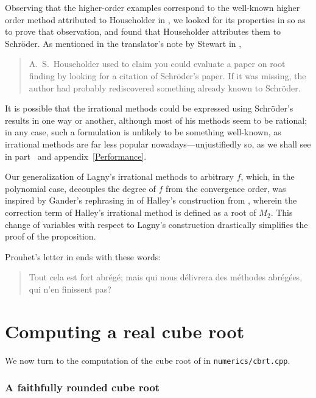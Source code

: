 ﻿\documentclass[10pt, a4paper, twoside]{basestyle}
\begin{document}
Observing that the higher-order examples correspond to the well-known higher order
method attributed to Householder in \cite{SebahGourdon2001}, we looked for its properties in \cite{Householder1970} so as to prove that observation, and found that Householder attributes
them to Schröder.
As mentioned in the translator’s note by Stewart in \cite{SchröderStewart1993},
\begin{quote}
A.~S.~Householder used to claim you could evaluate a paper on
root finding by looking for a citation of Schröder’s paper. If it was
missing, the author had probably rediscovered something already
known to Schröder.
\end{quote}
It is possible that the irrational methods could be expressed using Schröder’s results in one way or another, although most of his methods seem to be rational; in any case, such a formulation
is unlikely to be something well-known, as irrational methods are far less popular
nowadays---unjustifiedly so, as we shall see in part~\ref{CubeRoot} and appendix~\ref{Performance}.

Our generalization of Lagny's irrational methods to arbitrary $f$, which, in the polynomial case,
decouples the degree of $f$ from the convergence order, was inspired by Gander's rephrasing in
\cite{Gander1985} of Halley's construction from \cite{Halley1694}, wherein the correction term of
Halley's irrational method is defined as a root of $M_2$. This change of variables with respect to
Lagny's construction drastically simplifies the proof of the proposition.

Prouhet’s letter in \cite{Cantor1861} ends with these words:
\begin{quote}\textfrench{%
Tout cela est fort abrégé; mais qui nous délivrera des méthodes abrégées,
qui n'en finissent pas?}\end{quote}

\part{Computing a real cube root}
\label{CubeRoot}

We now turn to the computation of the cube root of in \texttt{numerics/cbrt.cpp}.

\section*{A faithfully rounded cube root}
\end{document}
